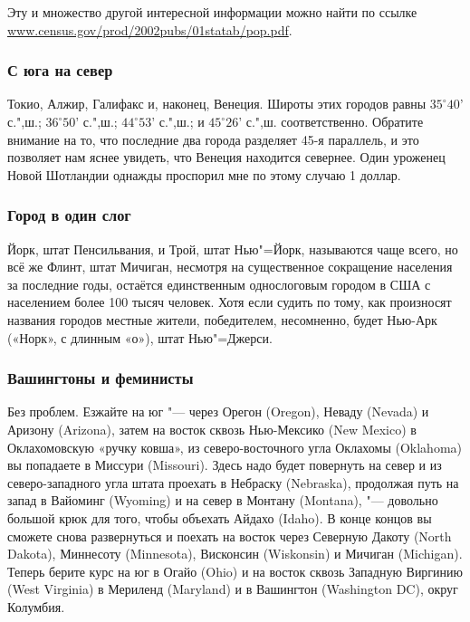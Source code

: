 \documentclass[twoside]{book}
\begin{document}
Эту и множество другой интересной информации можно найти по ссылке
\href{http//www.census.gov/prod/2002pubs/01statab/pop.pdf}{\url{www.census.gov/prod/2002pubs/01statab/pop.pdf}}.
 \heart                          

\subsubsection*{С юга на север}%

Токио, Алжир, Галифакс и, наконец, Венеция.
Широты этих городов равны
$35^\circ 40’$ с.",ш.; $36^\circ 50’$ с.",ш.; $44^\circ 53’$ с.",ш.; и $45^\circ 26’$ с.",ш. соответственно.
Обратите внимание на то, что последние два города разделяет 45-я параллель, и это позволяет нам яснее увидеть, что Венеция находится севернее.
Один уроженец Новой Шотландии однажды проспорил мне по этому случаю 1 доллар.
\heart

\subsubsection*{Город в один слог}%

Йорк, штат Пенсильвания, и Трой, штат Нью"=Йорк, называются чаще всего, но всё же Флинт, штат Мичиган, несмотря на существенное сокращение населения за последние годы, остаётся единственным однослоговым городом в США с населением более 100 тысяч человек.
Хотя если судить по тому, как произносят названия городов местные жители, победителем, несомненно, будет Нью-Арк («Норк», с длинным «о»), штат Нью"=Джерси.%
\heart

\subsubsection*{Вашингтоны и феминисты} %

{\sloppy 

Без проблем.
Езжайте на юг "--- через Орегон (Oregon), 
Неваду (Nevada) 
и Аризону (Arizona), 
затем на восток сквозь Нью-Мексико (New Mexico) 
в Оклахомовскую «ручку ковша», из северо-восточного угла Оклахомы (Oklahoma) 
вы попадаете в Миссури (Mis\-sou\-ri).
Здесь надо будет повернуть на север и из северо-западного угла штата проехать в Небраску (Nebraska), продолжая путь на запад в Вайоминг (Wyoming) и на север в Монтану (Montana), "--- довольно большой крюк для того, чтобы объехать Айдахо (Idaho).
В конце концов вы сможете снова развернуться и поехать на восток через Северную Дакоту (North Dakota), 
Миннесоту (Minnesota), 
Висконсин (Wiskonsin) 
и Мичиган (Michigan).
Теперь берите курс на юг в Огайо (Ohio) и на восток сквозь Западную Виргинию (West Virginia) в Мериленд (Maryland)
 и в Вашингтон (Washington DC), округ Колумбия.\heart
 
}
\end{document}
